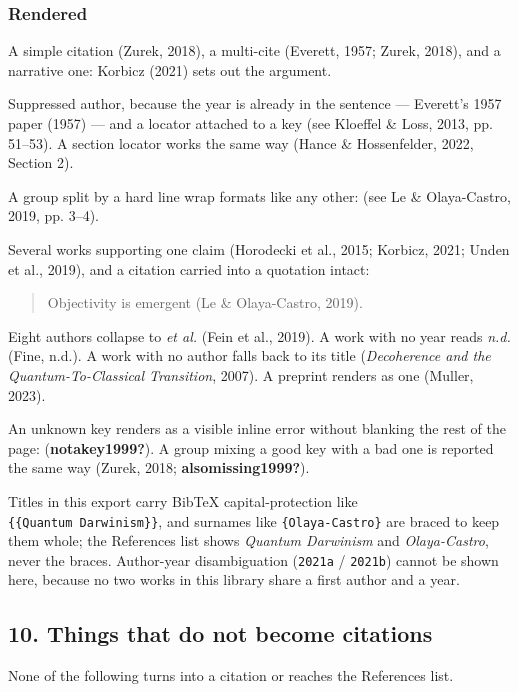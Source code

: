 \documentclass[
]{article}
\begin{document}
\subsubsection{Rendered}\label{rendered-9}

A simple citation (Zurek, 2018), a multi-cite (Everett, 1957; Zurek,
2018), and a narrative one: Korbicz (2021) sets out the argument.

Suppressed author, because the year is already in the sentence ---
Everett's 1957 paper (1957) --- and a locator attached to a key (see
Kloeffel \& Loss, 2013, pp. 51--53). A section locator works the same
way (Hance \& Hossenfelder, 2022, Section 2).

A group split by a hard line wrap formats like any other: (see Le \&
Olaya-Castro, 2019, pp. 3--4).

Several works supporting one claim (Horodecki et al., 2015; Korbicz,
2021; Unden et al., 2019), and a citation carried into a quotation
intact:

\begin{quote}
Objectivity is emergent (Le \& Olaya-Castro, 2019).
\end{quote}

Eight authors collapse to \emph{et al.} (Fein et al., 2019). A work with
no year reads \emph{n.d.} (Fine, n.d.). A work with no author falls back
to its title (\emph{Decoherence and the {Quantum-To-Classical
Transition}}, 2007). A preprint renders as one (Muller, 2023).

An unknown key renders as a visible inline error without blanking the
rest of the page: (\textbf{notakey1999?}). A group mixing a good key
with a bad one is reported the same way (Zurek, 2018;
\textbf{alsomissing1999?}).

Titles in this export carry BibTeX capital-protection like
\texttt{\{\{Quantum\ Darwinism\}\}}, and surnames like
\texttt{\{Olaya-Castro\}} are braced to keep them whole; the References
list shows \emph{Quantum Darwinism} and \emph{Olaya-Castro}, never the
braces. Author-year disambiguation (\texttt{2021a} / \texttt{2021b})
cannot be shown here, because no two works in this library share a first
author and a year.

\subsection{10. Things that do not become
citations}\label{things-that-do-not-become-citations}

None of the following turns into a citation or reaches the References
list.
\end{document}
